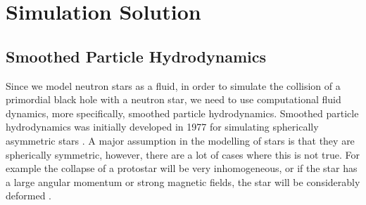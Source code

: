 %
%
% 
%
%
%
%
%

\chapter{Simulation Solution}
\label{chap:sim}

\section{Smoothed Particle Hydrodynamics}

Since we model neutron stars as a fluid, in order to simulate the collision of a primordial black hole with a neutron star, we need to use computational fluid dynamics, more specifically, smoothed particle hydrodynamics. Smoothed particle hydrodynamics was initially developed in 1977 for simulating spherically asymmetric stars \cite{origsph}. A major assumption in the modelling of stars is that they are spherically symmetric, however, there are a lot of cases where this is not true. For example the collapse of a protostar will be very inhomogeneous, or if the star has a large angular momentum or strong magnetic fields, the star will be considerably deformed \cite{origsph}. \\

